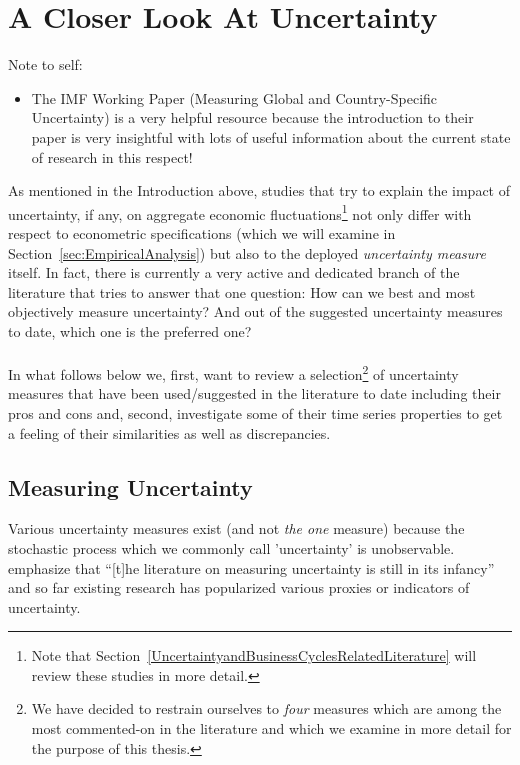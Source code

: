 \documentclass[a4paper,12pt,oneside,pointednumbers,bibtotoc,bigheadings,liststotoc]{scrbook}
\begin{document}
\chapter{A Closer Look At Uncertainty}
\label{MeasuringUncertaintyandaHistoricalView}

\begingroup
    \fontsize{8pt}{12pt}\selectfont
    Note to self:
\begin{itemize}
	\item  The IMF Working Paper (Measuring Global and Country-Specific Uncertainty) is a very helpful resource because the introduction to their paper is very insightful with lots of useful information about the current state of research in this respect!
\end{itemize}
\endgroup


As mentioned in the Introduction above, studies that try to explain the impact of uncertainty, if any, on aggregate economic fluctuations\footnote{Note that Section~\ref{UncertaintyandBusinessCyclesRelatedLiterature} will review these studies in more detail.} not only differ with respect to econometric specifications (which we will examine in Section~\ref{sec:EmpiricalAnalysis}) but also to the deployed \textit{uncertainty measure} itself. In fact, there is currently a very active and dedicated branch of the literature that tries to answer that one question: How can we best and most objectively measure uncertainty? And out of the suggested uncertainty measures to date, which one is the preferred one?\\
\\
In what follows below we, first, want to review a selection\footnote{We have decided to restrain ourselves to \textit{four} measures which are among the most commented-on in the literature and which we examine in more detail for the purpose of this thesis.} of uncertainty measures that have been used/suggested in the literature to date including their pros and cons and, second, investigate some of their time series properties to get a feeling of their similarities as well as discrepancies.

\section{Measuring Uncertainty}
\label{sec:MeasuringUncertainty}
Various uncertainty measures exist (and not \textit{the one} measure) because the stochastic process which we commonly call 'uncertainty' is unobservable. \citet[p. 1182]{juradoetal:15} emphasize that ``[t]he literature on measuring uncertainty is still in its infancy'' and so far existing research has popularized various proxies or indicators of uncertainty.
\end{document}
